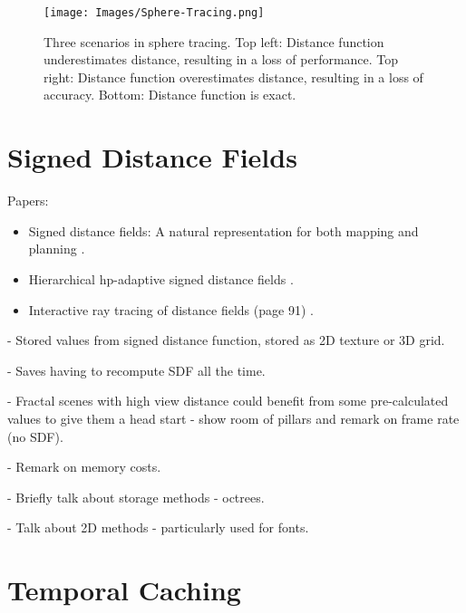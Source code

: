 \newpage

\begin{figure} [ht]
	\centering
	\texttt{[image: Images/Sphere-Tracing.png]}
	\caption{Three scenarios in sphere tracing. Top left: Distance function underestimates distance, resulting in a loss of performance. Top right: Distance function overestimates distance, resulting in a loss of accuracy. Bottom: Distance function is exact.}
	\label{figure:sphere-tracing}
\end{figure}

\section{Signed Distance Fields}



Papers:
\begin{itemize}
	\item Signed distance fields: A natural representation for both mapping and planning \cite{oleynikova2016signed}.
	\item Hierarchical hp-adaptive signed distance fields \cite{koschier2016hierarchical}.
	\item Interactive ray tracing of distance fields (page 91) \cite{jamrivska2010interactive}.
\end{itemize}

- Stored values from signed distance function, stored as 2D texture or 3D grid.

- Saves having to recompute SDF all the time.

- Fractal scenes with high view distance could benefit from some pre-calculated values to give them a head start - show room of pillars and remark on frame rate (no SDF).

- Remark on memory costs.

- Briefly talk about storage methods - octrees.

- Talk about 2D methods - particularly used for fonts.

\section{Temporal Caching} \label{section:temporal-caching}